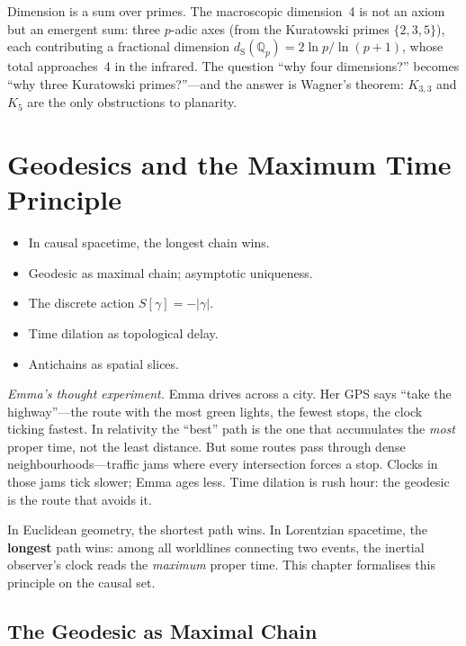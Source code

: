 \documentclass[11pt, a4paper, openany]{book}
\newcommand{\dS}{d_{\mathrm{S}}}
\newenvironment{introduction}[1][Modulo Overview]{%
  \begin{tcolorbox}[
    enhanced,colback=structure!5,colframe=structure,
    colbacktitle=structure,coltitle=white,
    fonttitle=\small\bfseries,title={#1},
    arc=2pt,boxrule=0.7pt,
    left=8pt,right=8pt,top=6pt,bottom=6pt,
    before skip=12pt,after skip=12pt
  ]\itshape\begin{itemize}[leftmargin=*,itemsep=2pt,parsep=0pt]
}{%
  \end{itemize}\end{tcolorbox}
}
\begin{document}
\begin{logicalreading}
Dimension is a sum over primes.
The macroscopic dimension~4 is not an axiom but an emergent sum:
three $p$-adic axes (from the Kuratowski primes $\{2,3,5\}$), each
contributing a fractional dimension $\dS(\mathbb{Q}_p) =
2\ln p/\ln(p+1)$, whose total approaches~4 in the infrared.
The question ``why four dimensions?'' becomes
``why three Kuratowski primes?''---and the answer is Wagner's
theorem: $K_{3,3}$ and $K_5$ are the only obstructions to
planarity.
\end{logicalreading}


\chapter{Geodesics and the Maximum Time Principle}\label{ch:geodesics}

\begin{introduction}
  \item In causal spacetime, the longest chain wins.
  \item Geodesic as maximal chain; asymptotic uniqueness.
  \item The discrete action $S[\gamma] = -|\gamma|$.
  \item Time dilation as topological delay.
  \item Antichains as spatial slices.
\end{introduction}

\smallskip\noindent
\textit{Emma's thought experiment.}
Emma drives across a city. Her GPS says ``take the highway''---the route
with the most green lights, the fewest stops, the clock ticking fastest.
In relativity the ``best'' path is the one that accumulates the
\emph{most} proper time, not the least distance. But some routes pass
through dense neighbourhoods---traffic jams where every intersection
forces a stop. Clocks in those jams tick slower; Emma ages less. Time
dilation is rush hour: the geodesic is the route that avoids it.
\smallskip

\noindent
In Euclidean geometry, the shortest path wins. In Lorentzian spacetime,
the \textbf{longest} path wins: among all worldlines connecting two
events, the inertial observer's clock reads the \emph{maximum} proper
time. This chapter formalises this principle on the causal set.

\section{The Geodesic as Maximal Chain}
\end{document}
